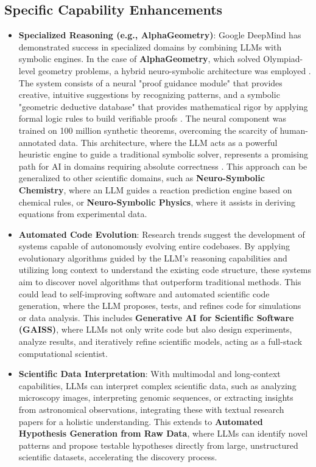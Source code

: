\documentclass{article}
\begin{document}
\subsection{Specific Capability Enhancements}
\begin{itemize}
    \item \textbf{Specialized Reasoning (e.g., AlphaGeometry)}: Google DeepMind has demonstrated success in specialized domains by combining LLMs with symbolic engines. In the case of \textbf{AlphaGeometry}, which solved Olympiad-level geometry problems, a hybrid neuro-symbolic architecture was employed \cite{trinh2024solving}. The system consists of a neural "proof guidance module" that provides creative, intuitive suggestions by recognizing patterns, and a symbolic "geometric deductive database" that provides mathematical rigor by applying formal logic rules to build verifiable proofs \cite{trinh2024solving}. The neural component was trained on 100 million synthetic theorems, overcoming the scarcity of human-annotated data. This architecture, where the LLM acts as a powerful heuristic engine to guide a traditional symbolic solver, represents a promising path for AI in domains requiring absolute correctness \cite{trinh2024solving}. This approach can be generalized to other scientific domains, such as \textbf{Neuro-Symbolic Chemistry}, where an LLM guides a reaction prediction engine based on chemical rules, or \textbf{Neuro-Symbolic Physics}, where it assists in deriving equations from experimental data.
    \item \textbf{Automated Code Evolution}: Research trends suggest the development of systems capable of autonomously evolving entire codebases. By applying evolutionary algorithms guided by the LLM's reasoning capabilities and utilizing long context to understand the existing code structure, these systems aim to discover novel algorithms that outperform traditional methods. This could lead to self-improving software and automated scientific code generation, where the LLM proposes, tests, and refines code for simulations or data analysis. This includes \textbf{Generative AI for Scientific Software (GAISS)}, where LLMs not only write code but also design experiments, analyze results, and iteratively refine scientific models, acting as a full-stack computational scientist.
    \item \textbf{Scientific Data Interpretation}: With multimodal and long-context capabilities, LLMs can interpret complex scientific data, such as analyzing microscopy images, interpreting genomic sequences, or extracting insights from astronomical observations, integrating these with textual research papers for a holistic understanding. This extends to \textbf{Automated Hypothesis Generation from Raw Data}, where LLMs can identify novel patterns and propose testable hypotheses directly from large, unstructured scientific datasets, accelerating the discovery process.
\end{itemize}
\end{document}
